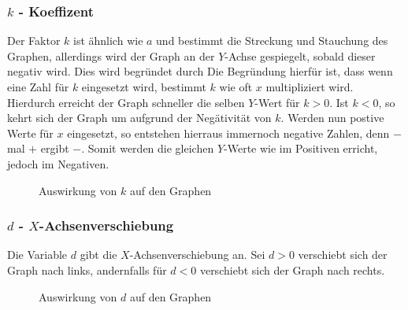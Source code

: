 \begin{beispiel}
\subsubsection{$k$ - Koeffizent} \label{sec:e-Funktion/Umformung von der normalen Exponentialfunktion zu der E-Funktion/Normalform/k - Koeffizent}
Der Faktor $k$ ist ähnlich wie $a$ und bestimmt die Streckung und Stauchung des Graphen, allerdings wird der Graph an der $Y$-Achse gespiegelt, sobald dieser negativ wird. Dies wird begründet durch 
Die Begründung hierfür ist, dass wenn eine Zahl für $k$ eingesetzt wird, bestimmt $k$ wie oft $x$ multipliziert wird. Hierdurch erreicht der Graph schneller die selben $Y$-Wert für $k>0$. Ist $k<0$, so kehrt sich der Graph um aufgrund der Negätivität von $k$. Werden nun postive Werte für $x$ eingesetzt, so entstehen hierraus immernoch negative Zahlen, denn $-$ mal $+$ ergibt $-$. Somit werden die gleichen $Y$-Werte wie im Positiven erricht, jedoch im Negativen.
\begin{figure}[h]
\centering
	\caption{Auswirkung von $k$ auf den Graphen}
\end{figure}


\pagebreak
\subsubsection{$d$ - $X$-Achsenverschiebung}\label{sec:E-Funktion/Umformung von der normalen Exponentialfunktion zu der E-Funktion/Normalform/d - X-Achsenverschiebung}
Die Variable $d$ gibt die $X$-Achsenverschiebung an. Sei $d>0$ verschiebt sich der Graph nach links, andernfalls für $d<0$ verschiebt sich der Graph nach rechts. 
\begin{figure}[h]
\centering
	\caption{Auswirkung von $d$ auf den Graphen}
\end{figure}


\end{beispiel}
